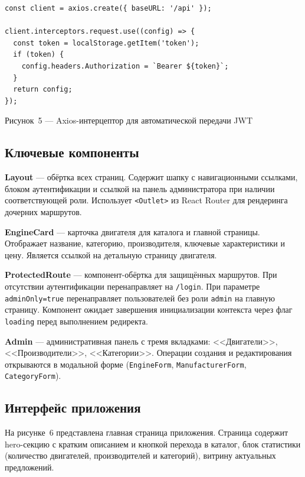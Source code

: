 \documentclass[14pt,a4paper]{extarticle}
\begin{document}
\begin{lstlisting}
const client = axios.create({ baseURL: '/api' });

client.interceptors.request.use((config) => {
  const token = localStorage.getItem('token');
  if (token) {
    config.headers.Authorization = `Bearer ${token}`;
  }
  return config;
});
\end{lstlisting}

\begin{center}
  Рисунок~5 --- Axios-интерцептор для автоматической передачи JWT
\end{center}

\subsection{Ключевые компоненты}

\textbf{Layout} --- обёртка всех страниц. Содержит шапку с навигационными ссылками, блоком аутентификации и ссылкой на панель администратора при наличии соответствующей роли. Использует \texttt{<Outlet>} из React Router для рендеринга дочерних маршрутов.

\textbf{EngineCard} --- карточка двигателя для каталога и главной страницы. Отображает название, категорию, производителя, ключевые характеристики и цену. Является ссылкой на детальную страницу двигателя.

\textbf{ProtectedRoute} --- компонент-обёртка для защищённых маршрутов. При отсутствии аутентификации перенаправляет на \texttt{/login}. При параметре \texttt{adminOnly=true} перенаправляет пользователей без роли \texttt{admin} на главную страницу. Компонент ожидает завершения инициализации контекста через флаг \texttt{loading} перед выполнением редиректа.

\textbf{Admin} --- административная панель с тремя вкладками: <<Двигатели>>, <<Производители>>, <<Категории>>. Операции создания и редактирования открываются в модальной форме (\texttt{EngineForm}, \texttt{ManufacturerForm}, \texttt{CategoryForm}).

\subsection{Интерфейс приложения}

На рисунке~6 представлена главная страница приложения. Страница содержит hero-секцию с кратким описанием и кнопкой перехода в каталог, блок статистики (количество двигателей, производителей и категорий), витрину актуальных предложений.
\end{document}
